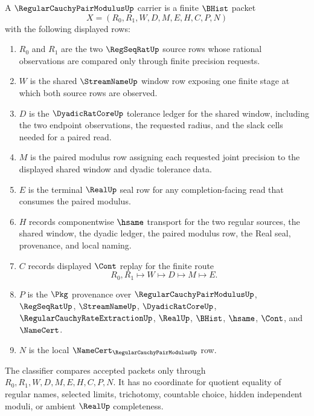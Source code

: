 \begin{definition}
\label{def:regular-cauchy-pair-modulus-carrier}
A $\RegularCauchyPairModulusUp$ carrier is a finite $\BHist$ packet
$$
X=(R_0,R_1,W,D,M,E,H,C,P,N)
$$
with the following displayed rows:
\begin{enumerate}
\item $R_0$ and $R_1$ are the two $\RegSeqRatUp$ source rows whose rational observations are compared only through finite precision requests.
\item $W$ is the shared $\StreamNameUp$ window row exposing one finite stage at which both source rows are observed.
\item $D$ is the $\DyadicRatCoreUp$ tolerance ledger for the shared window, including the two endpoint observations, the requested radius, and the slack cells needed for a paired read.
\item $M$ is the paired modulus row assigning each requested joint precision to the displayed shared window and dyadic tolerance data.
\item $E$ is the terminal $\RealUp$ seal row for any completion-facing read that consumes the paired modulus.
\item $H$ records componentwise $\hsame$ transport for the two regular sources, the shared window, the dyadic ledger, the paired modulus row, the Real seal, provenance, and local naming.
\item $C$ records displayed $\Cont$ replay for the finite route
$$
R_0,R_1 \longmapsto W \longmapsto D \longmapsto M \longmapsto E .
$$
\item $P$ is the $\Pkg$ provenance over $\RegularCauchyPairModulusUp$, $\RegSeqRatUp$, $\StreamNameUp$, $\DyadicRatCoreUp$, $\RegularCauchyRateExtractionUp$, $\RealUp$, $\BHist$, $\hsame$, $\Cont$, and $\NameCert$.
\item $N$ is the local $\NameCert_{\RegularCauchyPairModulusUp}$ row.
\end{enumerate}
The classifier compares accepted packets only through $R_0,R_1,W,D,M,E,H,C,P,N$. It has no coordinate for quotient equality of regular names, selected limits, trichotomy, countable choice, hidden independent moduli, or ambient $\RealUp$ completeness.
\end{definition}

